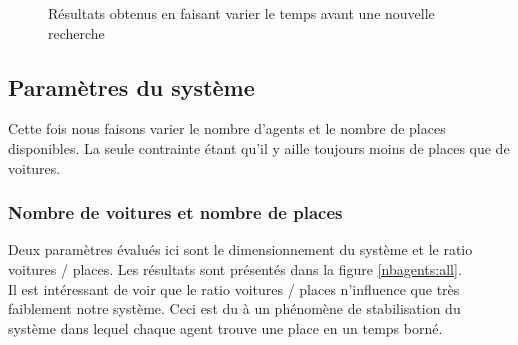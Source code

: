 \begin{figure}
\begin{center}
  \end{center}

  \caption{Résultats obtenus en faisant varier le temps avant une nouvelle recherche}
  \label{timeb4search:all}
\end{figure}

\subsection{Paramètres du système}

Cette fois nous faisons varier le nombre d'agents et le nombre de places disponibles. La seule contrainte étant qu'il y aille toujours moins de places que de voitures.

\subsubsection{Nombre de voitures et nombre de places}

Deux paramètres évalués ici sont le dimensionnement du système et le ratio voitures / places.
Les résultats sont présentés dans la figure \ref{nbagents:all}.\\

Il est intéressant de voir que le ratio voitures / places n'influence que très faiblement notre système.
Ceci est du à un phénomène de stabilisation du système dans lequel chaque agent trouve une place en un temps borné.\\

